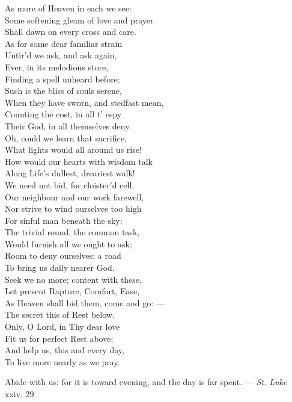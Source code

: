  As more of Heaven in each we see: \\
 Some softening gleam of love and prayer \\
 Shall dawn on every cross and care. \\
  As for some dear familiar strain \\
 Untir’d we ask, and ask again, \\
 Ever, in its melodious store, \\
 Finding a spell unheard before; \\
  Such is the bliss of souls serene, \\
 When they have sworn, and stedfast mean, \\
 Counting the cost, in all t’ espy \\
 Their God, in all themselves deny. \\
  Oh, could we learn that sacrifice, \\
 What lights would all around us rise! \\
 How would our hearts with wisdom talk \\
 Along Life’s dullest, dreariest walk! \\
  We need not bid, for cloister’d cell, \\
 Our neighbour and our work farewell, \\
 Nor strive to wind ourselves too high \\
 For sinful man beneath the sky: \\
  The trivial round, the common task, \\
 Would furnish all we ought to ask; \\
 Room to deny ourselves; a road \\
 To bring us daily nearer God. \\
  Seek we no more; content with these, \\
 Let present Rapture, Comfort, Ease, \\
 As Heaven shall bid them, come and go: — \\
 The secret this of Rest below. \\
  Only, O Lord, in Thy dear love \\
 Fit us for perfect Rest above; \\
 And help us, this and every day, \\
 To live more nearly as we pray.\\


Abide with us: for it is toward evening, and the day is far spent. — \emph{St. Luke} xxiv. 29.

